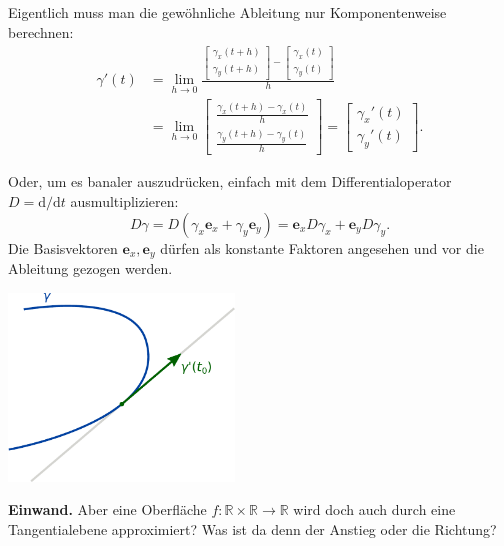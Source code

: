 \documentclass[9pt]{beamer}
\newcommand{\R}{\mathbb R}
\begin{document}
\begin{frame}
Eigentlich muss man die gewöhnliche Ableitung nur Komponentenweise
berechnen:
\[\begin{aligned}\gamma'(t) &= \lim_{h\to 0} \frac{
\begin{bmatrix}\gamma_x(t+h)\\ \gamma_y(t+h)\end{bmatrix}
-\begin{bmatrix}\gamma_x(t)\\ \gamma_y(t)\end{bmatrix}}{h}\\
& = \lim_{h\to 0}
\begin{bmatrix}\frac{\gamma_x(t+h)-\gamma_x(t)}{h}\\
\frac{\gamma_y(t+h)-\gamma_y(t)}{h}\end{bmatrix}
= \begin{bmatrix}\gamma_x'(t)\\ \gamma_y'(t)\end{bmatrix}.
\end{aligned}\]
\end{frame}

\begin{frame}
Oder, um es banaler auszudrücken, einfach mit dem Differentialoperator
$D=\mathrm d/\mathrm dt$ ausmultiplizieren:
\[D\gamma = D(\gamma_x\mathbf e_x+\gamma_y\mathbf e_y)
= \mathbf e_x D\gamma_x+\mathbf e_y D\gamma_y.\]
Die Basisvektoren $\mathbf e_x,\mathbf e_y$ dürfen als konstante
Faktoren angesehen und vor die Ableitung gezogen werden.

\end{frame}

\begin{frame}
\begin{center}
\includegraphics[width=0.45\textwidth]{img/Tangentialvektor.pdf}
\end{center}
\end{frame}

\begin{frame}
\textbf{Einwand.}
Aber eine Oberfläche $f\colon\R\times\R\to\R$ wird doch auch durch
eine Tangentialebene approximiert? Was ist da denn der Anstieg
oder die Richtung?
\end{frame}
\end{document}

